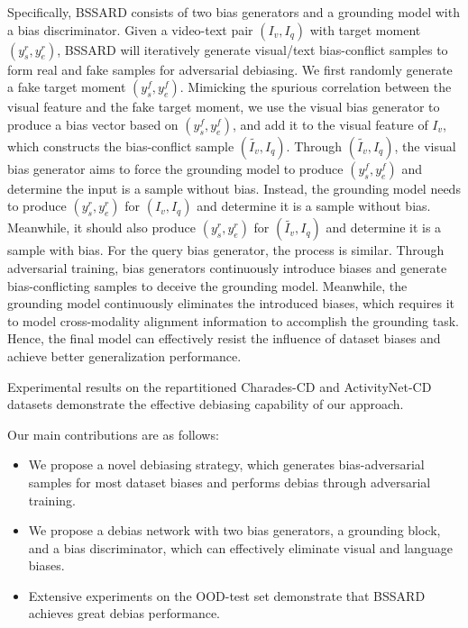 Specifically, BSSARD consists of two bias generators and a grounding model with a bias discriminator. Given a video-text pair $(I_v,I_q)$ with target moment $(y_s^r, y_e^r)$, BSSARD will iteratively generate visual/text bias-conflict samples to form real and fake samples for adversarial debiasing. We first randomly generate a fake target moment $(y^f_s, y^f_e)$. 
Mimicking the spurious correlation between the visual feature and the fake target moment, we use the visual bias generator to produce a bias vector based on $(y^f_s, y^f_e)$, and add it to the visual feature of $I_v$, which constructs the bias-conflict sample $(\tilde{I_v},I_q)$. Through $(\tilde{I_v},I_q)$, the visual bias generator aims to force the grounding model to produce $(y^f_s, y^f_e)$ and determine the input is a sample without bias. 
Instead, the grounding model needs to produce $(y_s^r, y_e^r)$ for $(I_v,I_q)$ and determine it is a sample without bias. Meanwhile, it should also produce $(y_s^r, y_e^r)$ for $(\tilde{I_v},I_q)$ and determine it is a sample with bias. 
For the query bias generator, the process is similar. 
Through adversarial training, bias generators continuously introduce biases and generate bias-conflicting samples to deceive the grounding model.
Meanwhile, the grounding model continuously eliminates the introduced biases, which requires it to model cross-modality alignment information to accomplish the grounding task. 
Hence, the final model can effectively resist the influence of dataset biases and achieve better generalization performance.

Experimental results on the repartitioned Charades-CD and ActivityNet-CD datasets demonstrate the effective debiasing capability of our approach. 

Our main contributions are as follows: 
\begin{itemize}
	\item We propose a novel debiasing strategy, which generates bias-adversarial samples for most dataset biases and performs debias through adversarial training. 
	\item We propose a debias network with two bias generators, a grounding block, and a bias discriminator, which can effectively eliminate visual and language biases. 
	\item Extensive experiments on the OOD-test set demonstrate that BSSARD achieves great debias performance.
\end{itemize}
